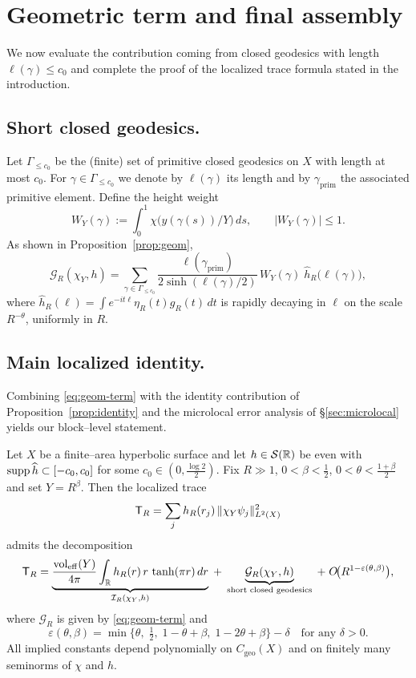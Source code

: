 \section{Geometric term and final assembly}\label{sec:geometric}

We now evaluate the contribution coming from closed geodesics with
length $\ell(\gamma)\le c_0$ and complete the proof of the localized
trace formula stated in the introduction.

\subsection{Short closed geodesics.}
Let $\Gamma_{\le c_0}$ be the (finite) set of primitive closed geodesics on
$X$ with length at most $c_0$.
For $\gamma\in\Gamma_{\le c_0}$ we denote by $\ell(\gamma)$ its length and
by $\gamma_{\mathrm{prim}}$ the associated primitive element.
Define the height weight
\[
W_Y(\gamma):=\int_0^1 \chi\!\big(y(\gamma(s))/Y\big)\,ds,\qquad |W_Y(\gamma)|\le 1.
\]
As shown in Proposition~\ref{prop:geom},
\begin{equation}\label{eq:geom-term}
\mathcal{G}_R(\chi_Y,h)
=\sum_{\gamma\in\Gamma_{\le c_0}}
\frac{\ell(\gamma_{\mathrm{prim}})}{2\sinh(\ell(\gamma)/2)}\,
W_Y(\gamma)\;\widehat h_R\!\big(\ell(\gamma)\big),
\end{equation}
where $\widehat h_R(\ell)=\int e^{-it\ell}\eta_R(t)g_R(t)\,dt$ is rapidly
decaying in $\ell$ on the scale $R^{-\theta}$, uniformly in $R$.

\subsection{Main localized identity.}
Combining \eqref{eq:geom-term} with the identity contribution of
Proposition~\ref{prop:identity} and the microlocal error analysis of
\S\ref{sec:microlocal} yields our block--level statement.

\begin{theorem}\label{thm:main}
Let $X$ be a finite--area hyperbolic surface and let $h\in\mathcal{S}(\mathbb{R})$
be even with $\operatorname{supp} \widehat{h}\subset[-c_0,c_0]$ for some
$c_0\in(0,\tfrac{\log 2}{2})$.
Fix $R\gg1$, $0<\beta<\tfrac12$, $0<\theta<\tfrac{1+\beta}{2}$ and set
$Y=R^\beta$.
Then the localized trace
\[
\mathsf{T}_R=\sum_j h_R(r_j)\,\|\chi_Y\psi_j\|_{L^2(X)}^2
\]
admits the decomposition
\[
\mathsf{T}_R
=\underbrace{\frac{\operatorname{vol}_{\mathrm{eff}}(Y)}{4\pi}
\int_{\mathbb{R}} h_R(r)\, r\,\tanh(\pi r)\,dr}_{\mathcal{I}_R(\chi_Y,h)}
\;+\;
\underbrace{\mathcal{G}_R(\chi_Y,h)}_{\text{short closed geodesics}}
\;+\; O\!\big(R^{1-\varepsilon(\theta,\beta)}\big),
\]
where $\mathcal{G}_R$ is given by \eqref{eq:geom-term} and
\[
\varepsilon(\theta,\beta)
=\min\Big\{\theta,\; \tfrac12,\; 1-\theta+\beta,\; 1-2\theta+\beta\Big\}
-\delta\quad \text{for any }\delta>0.
\]
All implied constants depend polynomially on $C_{\mathrm{geo}}(X)$ and on
finitely many seminorms of $\chi$ and $h$.
\end{theorem}

